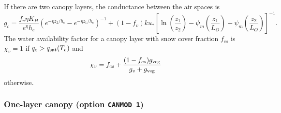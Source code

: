 \documentclass[fleqn]{article}
\begin{document}
If there are two canopy layers, the conductance between the air spaces is
\begin{equation}
g_c = \frac{f_v\eta K_H}{e^\eta h_c}\left(e^{-\eta z_2/h_c} - e^{-\eta z_1/h_c}\right)^{-1} +
      (1 - f_v)ku_*\left[\ln\left(\frac{z_1}{z_2}\right) - \psi_m\left(\frac{z_1}{L_O}\right) + \psi_m\left(\frac{z_2}{L_O}\right)\right]^{-1}.
\end{equation}
The water availability factor for a canopy layer with snow cover fraction $f_{cs}$ is $\chi_v = 1$ if $q_c > q_{\rm sat}(T_v)$ and
\begin{equation}
\chi_v = f_{cs} + \frac{(1 - f_{cs})g_{\rm veg}}{g_v + g_{\rm veg}}
\end{equation}
otherwise.

\subsubsection{One-layer canopy (option {\tt CANMOD 1})}
\end{document}
